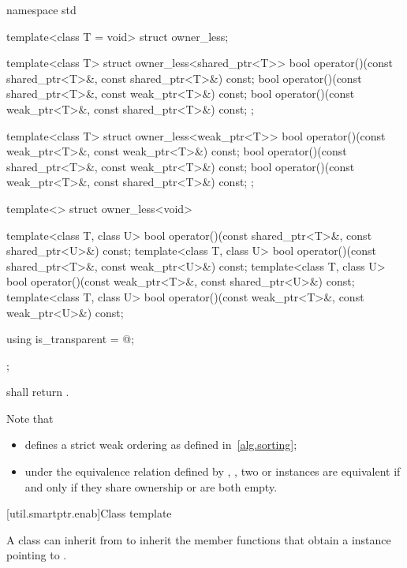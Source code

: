 %
\begin{codeblock}
namespace std {
  template<class T = void> struct owner_less;

  template<class T> struct owner_less<shared_ptr<T>> {
    bool operator()(const shared_ptr<T>&, const shared_ptr<T>&) const;
    bool operator()(const shared_ptr<T>&, const weak_ptr<T>&) const;
    bool operator()(const weak_ptr<T>&, const shared_ptr<T>&) const;
  };

  template<class T> struct owner_less<weak_ptr<T>> {
    bool operator()(const weak_ptr<T>&, const weak_ptr<T>&) const;
    bool operator()(const shared_ptr<T>&, const weak_ptr<T>&) const;
    bool operator()(const weak_ptr<T>&, const shared_ptr<T>&) const;
  };

  template<> struct owner_less<void> {
    template<class T, class U>
      bool operator()(const shared_ptr<T>&, const shared_ptr<U>&) const;
    template<class T, class U>
      bool operator()(const shared_ptr<T>&, const weak_ptr<U>&) const;
    template<class T, class U>
      bool operator()(const weak_ptr<T>&, const shared_ptr<U>&) const;
    template<class T, class U>
      bool operator()(const weak_ptr<T>&, const weak_ptr<U>&) const;

    using is_transparent = @\unspec@;
  };
}
\end{codeblock}

%
\pnum {} shall return . \begin{note}
Note that

\begin{itemize}
\item {} defines a strict weak ordering as defined in~\ref{alg.sorting};

\item under the equivalence relation defined by ,
, two  or
 instances are equivalent if and only if they share ownership or are
both empty.
\end{itemize} \end{note}

[util.smartptr.enab]{Class template }

\pnum
{}%
A class  can inherit from 
to inherit the  member functions that obtain
a  instance pointing to .


